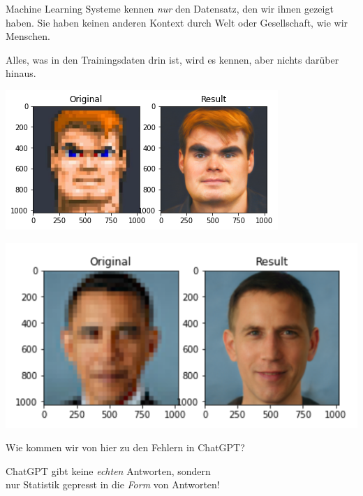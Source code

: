 \documentclass[aspectratio=169,usenames,dvipsnames]{beamer}
\begin{document}
\begin{frame}
\begin{minipage}{0.45\textwidth}
\large
Machine Learning Systeme kennen \emph{nur} den Datensatz, den wir ihnen gezeigt haben.
Sie haben keinen anderen Kontext durch Welt oder Gesellschaft, wie wir Menschen.
\bigskip

Alles, was in den Trainingsdaten drin ist, wird es kennen, aber nichts darüber hinaus.
\end{minipage}\hfill\begin{minipage}{0.5\textwidth}
\begin{center}
\pause
\includegraphics[height=0.45\textheight]{images/doomguy}
\pause

\includegraphics[height=0.45\textheight]{images/obama} 
\end{center}
\end{minipage}
\end{frame}

\begin{frame}
\begin{center}
\Large
Wie kommen wir von hier zu den Fehlern in ChatGPT?
\pause
\bigskip\bigskip

ChatGPT gibt keine \emph{echten} Antworten, sondern\\ nur Statistik gepresst in die \emph{Form} von Antworten!
\end{center}
\end{frame}
\end{document}
